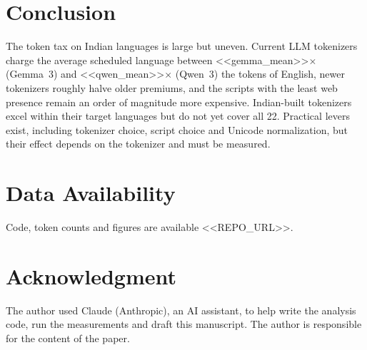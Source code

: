 \documentclass[conference]{IEEEtran}
\begin{document}
\section{Conclusion}
The token tax on Indian languages is large but uneven. Current LLM tokenizers charge the average scheduled language between <<gemma_mean>>$\times$ (Gemma~3) and <<qwen_mean>>$\times$ (Qwen~3) the tokens of English, newer tokenizers roughly halve older premiums, and the scripts with the least web presence remain an order of magnitude more expensive. Indian-built tokenizers excel within their target languages but do not yet cover all 22. Practical levers exist, including tokenizer choice, script choice and Unicode normalization, but their effect depends on the tokenizer and must be measured.

\section*{Data Availability}
Code, token counts and figures are available <<REPO_URL>>.

\section*{Acknowledgment}
The author used Claude (Anthropic), an AI assistant, to help write the analysis code, run the measurements and draft this manuscript. The author is responsible for the content of the paper.



\end{document}
